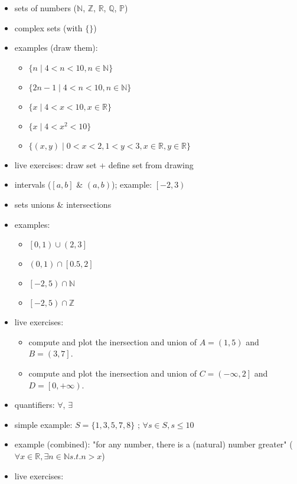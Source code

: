 \documentclass[a4paper,12pt]{article}
\providecommand{\tightlist}{\setlength{\itemsep}{0pt}\setlength{\parskip}{0pt}}
\newcommand{\Q}{\mathbb{Q}}
\newcommand{\N}{\mathbb{N}}
\newcommand{\Z}{\mathbb{Z}}
\newcommand{\R}{\mathbb{R}}
\newcommand{\Primes}{\mathbb{P}}
\begin{document}
	\begin{itemize}
	\tightlist
	\item
	sets of numbers (\(\N\), \(\Z\), \(\R\), \(\Q\), \(\Primes\))
	\item
	complex sets (with \(\{ \}\))
	\item
	examples (draw them):
	
	\begin{itemize}
		\tightlist
		\item
		\(\{n \mid 4<n<10, n \in \N \}\)
		\item
		\(\{2n-1 \mid 4<n<10 , n \in \N \}\)
		\item
		\(\{x \mid 4<x<10, x \in \R \}\)
		\item
		\(\{x \mid 4<x^2<10 \}\)
		\item
		\(\{(x,y) \mid 0<x<2 , 1<y<3, x \in \R, y \in \R \}\)
	\end{itemize}
	\item
	live exercises: draw set + define set from drawing
	\item
	intervals (\(\left[a,b\right]\) \& \(\left(a,b\right)\)); example:
	\(\left[-2, 3\right)\)
	\item
	sets unions \& intersections
	\item
	examples:
	
	\begin{itemize}
		\tightlist
		\item
		\(\left[0,1\right) \cup \left(2,3\right]\)
		\item
		\(\left(0,1\right) \cap \left[0.5,2\right]\)
		\item
		\(\left[-2,5\right) \cap \N\)
		\item
		\(\left[-2,5\right) \cap \Z\)
	\end{itemize}
	\item
	live exercises:
	
	\begin{itemize}
		\tightlist
		\item
		compute and plot the inersection and union of
		\(A = \left(1, 5\right)\) and \(B = \left(3, 7\right]\).
		\item
		compute and plot the inersection and union of
		\(C = \left(-\infty, 2\right]\) and
		\(D = \left[0, +\infty \right)\).
	\end{itemize}
	\item
	quantifiers: \(\forall\), \(\exists\)
	\item
	simple example: $S = \{ 1,3,5,7,8 \} \textit{ ; } \forall s \in S, s \leq 10$
	\item
	example (combined): "for any number, there is a (natural) number
	greater" (\(\forall x \in \R, \exists n \in \N s.t. n>x\))
	\item
	live exercises:
	

\end{itemize}
\end{document}
